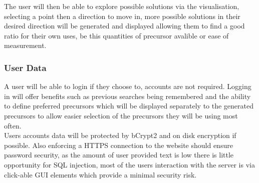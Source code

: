 The user will then be able to explore possible solutions via the visualisation, selecting a point then a direction to move in, more possible solutions in their desired direction will be generated and displayed allowing them to find a good ratio for their own uses, be this quantities of precursor avalible or ease of measurement.

\subsubsection{User Data}
A user will be able to login if they choose to, accounts are not required. Logging in will offer benefits such as previous searches being remembered and the ability to define preferred precursors which will be displayed separately to the generated precursors to allow easier selection of the precursors they will be using most often.\\

Users accounts data will be protected by bCrypt2 and on disk encryption if possible. Also enforcing a HTTPS connection to the website should ensure password security, as the amount of user provided text is low there is little opportunity for SQL injection, most of the users interaction with the server is via click-able GUI elements which provide a minimal security risk.